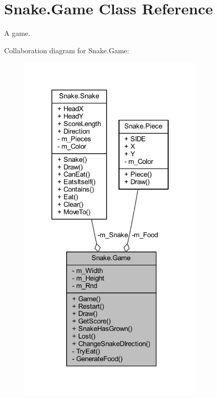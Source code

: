 \hypertarget{class_snake_1_1_game}{}\section{Snake.\+Game Class Reference}
\label{class_snake_1_1_game}


A game.  




Collaboration diagram for Snake.\+Game\+:
\nopagebreak
\begin{figure}[H]
\begin{center}
\leavevmode
\includegraphics[width=250pt]{dc/dc7/class_snake_1_1_game__coll__graph}
\end{center}
\end{figure}
